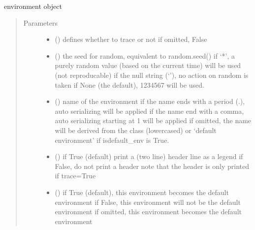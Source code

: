 \documentclass[letterpaper,10pt,english]{sphinxmanual}
\begin{document}
\begin{fulllineitems}
\label{\detokenize{Reference:salabim.Environment}}
environment object
\begin{quote}\begin{description}
\item[{Parameters}] \leavevmode\begin{itemize}
\item {} 
 () \textendash{} defines whether to trace or not 
if omitted, False

\item {} 
 (\sphinxstyleliteralemphasis{, }) \textendash{} the seed for random, equivalent to random.seed() 
if ‘*’, a purely random value (based on the current time) will be used
(not reproducable) 
if the null string (‘’), no action on random is taken 
if None (the default), 1234567 will be used.

\item {} 
 () \textendash{} name of the environment 
if the name ends with a period (.),
auto serializing will be applied 
if the name end with a comma,
auto serializing starting at 1 will be applied 
if omitted, the name will be derived from the class (lowercased)
or ‘default environment’ if isdefault\_env is True.

\item {} 
 () \textendash{} if True (default) print a (two line) header line as a legend 
if False, do not print a header 
note that the header is only printed if trace=True

\item {} 
 () \textendash{} if True (default), this environment becomes the default environment 
if False, this environment will not be the default environment 
if omitted, this environment becomes the default environment 

\end{itemize}


\end{description}
\end{quote}
\end{fulllineitems}
\end{document}
